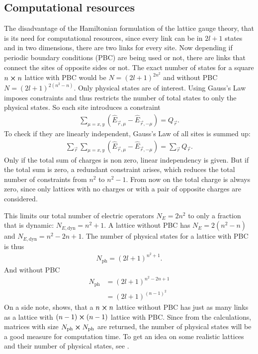 \subsection{Computational resources}
The disadvantage of the Hamiltonian formulation of the lattice gauge theory, that is its need for computational resources,\cite{Feynman1982} since every link can be in $2l+1$ states and in two dimensions, there are two links for every site. Now depending if periodic boundary conditions (PBC) are being used or not, there are links that connect the sites of opposite sides or not.
The exact number of states for a square $n \cross n$ lattice with PBC would be $N=(2l+1)^{2n^2}$ and without PBC $N=(2l+1)^{2(n^2-n)}$. Only physical states are of interest. Using Gauss's Law imposes constraints and thus restricts the number of total states to only the physical states. So each site introduces a constraint
\begin{align}
	\sum_{\mu=x,y}\left(\hat{E}_{\vec{r}, \mu} - \hat{E}_{\vec{r}, -\mu}\right) = Q_{\vec{r}}.
\end{align}
To check if they are linearly independent, Gauss's Law of all sites is summed up:
\begin{align}
	\sum_{\vec{r}}\sum_{\mu=x,y}\left(\hat{E}_{\vec{r}, \mu} - \hat{E}_{\vec{r}, -\mu}\right) = \sum_{\vec{r}}Q_{\vec{r}}.
\end{align}
Only if the total sum of charges is non zero, linear independency is given. But if the total sum is zero, a redundant constraint arises, which reduces the total number of constraints from $n^2$ to $n^2 -1$. From now on the total charge is always zero, since only lattices with no charges or with a pair of opposite charges are considered.

This limits our total number of electric operators $N_{E}=2n^2$ to only a fraction that is dynamic: $N_{E,\text{dyn}} = n^2+1$. A lattice without PBC has $N_{E}=2(n^2-n)$ and $N_{E,\text{dyn}} = n^2-2n+1$.
The number of physical states for a lattice with PBC is thus
\begin{align}
	N_{\text{ph}}=(2l+1)^{n^2+1}.
\end{align}
And without PBC
\begin{align}
	N_{\text{ph}} & =(2l+1)^{n^2-2n+1} \\
                & =(2l+1)^{(n-1)^{2}}\label{eq:pbc}
\end{align}
On a side note,  shows, that a $n\cross n$ lattice without PBC has just as many links as a lattice with $(n-1)\cross(n-1)$ lattice with PBC.
Since from the calculations, matrices with size $N_{\text{ph}} \cross N_{\text{ph}}$ are returned, the number of physical states will be a good measure for computation time.
To get an idea on some realistic lattices and their number of physical states, see .

